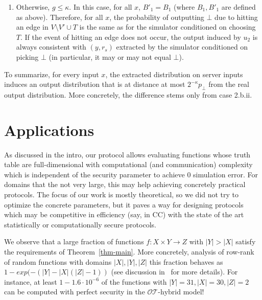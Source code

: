\documentclass{llncs}
\newcommand{\OTfunc}{\mathcal{OT}}
\newcommand{\OThybrid}{\OTfunc\mbox{-}\text{hybrid}}
\newcommand{\sOT}[3]{\binom{#2}{#1}\text{-}#3\text{-string-OT}}
\begin{document}
{\begin{enumerate}
\begin{enumerate}
\begin{enumerate}
		The probability of outputting $\bot$ conditioned on choosing $T$ by the simulator is $1$. 
		\item Otherwise, $g\leq \kappa$. In this case, for all $x$, $B'_1=B_1$ (where $B_1,B'_1$ are defined as above). Therefore, for all $x$, the probability of outputting $\bot$ due to hitting an edge in $V\setminus{V'}\cup T$ is the same as for the simulator conditioned on choosing $T$. If the event of hitting an edge does not occur, the output induced by $u_2$ is always consistent with $(y,r_s)$ extracted by the simulator conditioned on picking $\bot$ (in particular, it may or may not equal $\bot$). 
\end{enumerate}
 	\end{enumerate}
\end{enumerate}

To summarize, for every input $x$, the extracted distribution on server inputs induces an output distribution that is at distance at most $2^{-\kappa}p_\bot$ from the real output distribution. More concretely, the difference stems only from case 2.b.ii.


\section{Applications}

As discussed in the intro, our protocol allows evaluating functions whose truth table are full-dimensional with computational (and communication) complexity which is independent of the security parameter to achieve 0 simulation error.
For domains that the not very large, this may help achieving concretely practical protocols. The focus of our work is mostly theoretical, so we did not try to optimize the concrete parameters, but it paves a way for designing protocols which may be competitive in efficiency (say, in CC) with the state of the art statistically or computationally secure protocols.

We observe that a large fraction of functions $f:X\times Y\rightarrow Z$ with $|Y|>|X|$ satisfy the requirements of Theorem~\ref{thm-main}. More concretely, analysis of row-rank of random functions with domains $|X|,|Y|,|Z|$ this fraction behaves
as $1-exp(-(|Y|-|X|(|Z|-1))$ (see discussion in~\cite{Ash14} for more details). For instance, at least $1-1.6\cdot 10^{-6}$ of the functions with $|Y|=31,|X|=30,|Z|=2$ can be computed with perfect security in the $\OThybrid$ model!

}
\end{document}
